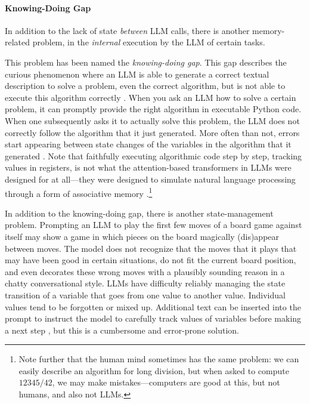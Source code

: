 \paragraph{Knowing-Doing Gap}\label{sec:knowing}
In addition to the lack of state {\em between} LLM calls, there is another memory-related problem, in the {\em internal}  execution by the LLM of certain tasks. 

This problem  has been named  the {\em knowing-doing gap}. This gap describes the curious phenomenon where an LLM is able to generate a correct textual description  to solve a problem, even the correct algorithm, but is not able to execute this algorithm correctly \citep{paglieri2024balrog}. When you ask an LLM how to solve a certain problem, it can promptly provide the right algorithm in executable Python code. When one subsequently asks it to actually solve this problem, the LLM does not correctly follow the algorithm that it just generated. More often than not, errors start appearing between  state changes of the variables in the algorithm that it generated \citep{paglieri2024balrog,ruoss2024lmact}. Note that faithfully executing algorithmic code step by step, tracking values in registers, is not what the attention-based transformers in LLMs were designed for at all---they were designed to simulate natural language processing through a form of associative memory \citep{la2024code}.\footnote{Note further that the human mind sometimes has the same problem: we can easily describe an algorithm for long division, but when asked to compute $12345/42$, we may make mistakes---computers are good at this, but not humans, and also not LLMs.}

In addition to the knowing-doing gap, there is another state-management problem.
Prompting an LLM to play the first few moves of a board game against itself may show a game in which pieces on the board magically (dis)appear  between moves. The model does not recognize that the moves that it plays that may have been good in certain situations,  do not fit the current board position, and  even decorates these wrong moves with a plausibly sounding reason in a chatty conversational style. %
LLMs have difficulty  reliably managing the state transition of a variable that goes from one value to another value. Individual values tend to be forgotten or mixed up. Additional text can be inserted into the prompt to instruct the model to carefully track values of variables before making a next step \citep{la2024code}, but this is a cumbersome and error-prone solution. %

